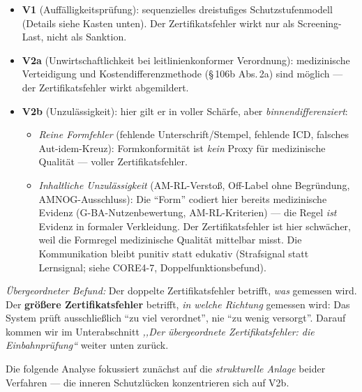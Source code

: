 \documentclass{umbruch-position}
\begin{document}
\begin{itemize}[nosep, leftmargin=1.4em]
  \item \textbf{V1} (Auff\"alligkeitspr\"ufung): sequenzielles dreistufiges Schutzstufenmodell (Details siehe Kasten unten). Der Zertifikatsfehler wirkt nur als Screening-Last, nicht als Sanktion.
  \item \textbf{V2a} (Unwirtschaftlichkeit bei leitlinienkonformer Verordnung): medizinische Verteidigung und Kostendifferenzmethode (\S\,106b Abs.\,2a) sind m\"oglich --- der Zertifikatsfehler wirkt abgemildert.
  \item \textbf{V2b} (Unzul\"assigkeit): hier gilt er in voller Sch\"arfe, aber \emph{binnendifferenziert}:
    \begin{itemize}[nosep, leftmargin=1.4em]
      \item[(i)] \textit{Reine Formfehler} (fehlende Unterschrift/Stempel, fehlende ICD, falsches Aut-idem-Kreuz): Formkonformit\"at ist \emph{kein} Proxy f\"ur medizinische Qualit\"at --- voller Zertifikatsfehler.
      \item[(ii)] \textit{Inhaltliche Unzul\"assigkeit} (AM-RL-Versto\ss{}, Off-Label ohne Begr\"undung, AMNOG-Ausschluss): Die ``Form'' codiert hier bereits medizinische Evidenz (G-BA-Nutzenbewertung, AM-RL-Kriterien) --- die Regel \emph{ist} Evidenz in formaler Verkleidung. Der Zertifikatsfehler ist hier schw\"acher, weil die Formregel medizinische Qualit\"at mittelbar misst. Die Kommunikation bleibt punitiv statt edukativ (Strafsignal statt Lernsignal; siehe CORE4-7, Doppelfunktionsbefund).
    \end{itemize}
\end{itemize}

\noindent\textit{\"Ubergeordneter Befund:} Der doppelte Zertifikatsfehler betrifft, \emph{was} gemessen wird. Der \textbf{gr\"o\ss{}ere Zertifikatsfehler} betrifft, \emph{in welche Richtung} gemessen wird: Das System pr\"uft ausschlie\ss{}lich ``zu viel verordnet'', nie ``zu wenig versorgt''. Darauf kommen wir im Unterabschnitt \textit{,,Der \"ubergeordnete Zertifikatsfehler: die Einbahnpr\"ufung``} weiter unten zur\"uck.

Die folgende Analyse fokussiert zun\"achst auf die \textit{strukturelle Anlage} beider Verfahren --- die inneren Schutzl\"ucken konzentrieren sich auf V2b.

\medskip
\end{document}
